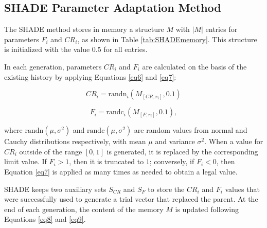 \documentclass[review]{elsarticle}
\begin{document}
\subsection{SHADE Parameter Adaptation Method}

The SHADE method stores in memory a structure $M$ with $|M|$ entries for parameters $F_i$ and $CR_i$, as shown in Table \ref{tab:SHADEmemory}. This structure is initialized with the value $0.5$ for all entries.

\begin{table}[!h]
	\centering
	\setlength{\tabcolsep}{13pt}
	\caption{Historical memory $M_{CR}$, $M_{F}$ used by SHADE \cite{tanabe2013success}.}
	\label{tab:SHADEmemory}
\end{table}

In each generation, parameters $CR_i$ and $F_i$ are calculated on the basis of the existing history by applying Equations \eqref{eq6} and \eqref{eq7}:

\begin{equation}
CR_i = \text{randn}_i(M_{[CR,r_i]}, 0.1)
\label{eq6}
\end{equation}

\begin{equation}
F_i = \text{randc}_i(M_{[F,r_i]}, 0.1),
\label{eq7}
\end{equation}

\noindent where $\text{randn}(\mu, \sigma^2)$ and $\text{randc}(\mu, \sigma^2)$ are random values from normal and Cauchy distributions respectively, with mean $\mu$ and variance $\sigma^2$. When a value for $CR_i$ outside of the range $[0,1]$ is generated, it is replaced by the corresponding limit value. If $F_i > 1$, then it is truncated to $1$; conversely, if $F_i < 0$, then Equation \eqref{eq7} is applied as many times as needed to obtain a legal value.

SHADE keeps two auxiliary sets $S_{CR}$ and $S_F$ to store the $CR_i$ and $F_i$ values that were successfully used to generate a trial vector that replaced the parent. At the end of each generation, the content of the memory $M$ is updated following Equations \eqref{eq8} and \eqref{eq9}.
\end{document}
